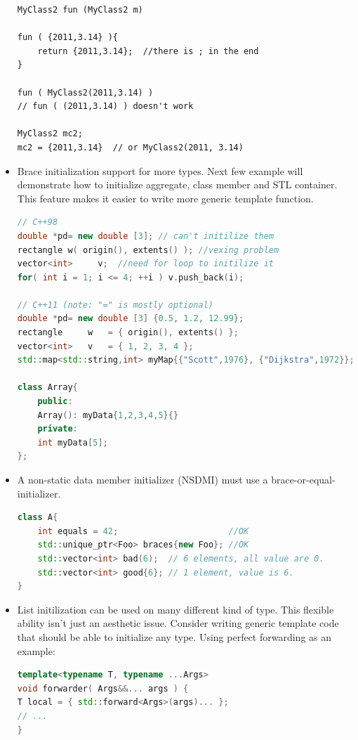 \documentclass[a4paper,11pt,twoside]{book}
\begin{document}
\begin{itemize}
\begin{lstlisting}
MyClass2 fun (MyClass2 m) 

fun ( {2011,3.14} ){
	return {2011,3.14};  //there is ; in the end
}

fun ( MyClass2(2011,3.14) ) 
// fun ( (2011,3.14) ) doesn't work

MyClass2 mc2;
mc2 = {2011,3.14}  // or MyClass2(2011, 3.14)
\end{lstlisting}

    \item Brace initialization support for more types. Next few example will demonstrate how to initialize aggregate, class member and STL container. This feature makes it easier to write more generic template function. 

\begin{lstlisting}[frame=single, language=c++,mathescape=true]
// C++98 
double *pd= new double [3]; // can't initilize them
rectangle w( origin(), extents() ); //vexing problem
vector<int>     v;  //need for loop to initilize it
for( int i = 1; i <= 4; ++i ) v.push_back(i);

// C++11 (note: "=" is mostly optional)
double *pd= new double [3] {0.5, 1.2, 12.99};
rectangle     w   = { origin(), extents() }; 
vector<int>   v   = { 1, 2, 3, 4 };
std::map<std::string,int> myMap{{"Scott",1976}, {"Dijkstra",1972}};

class Array{
	public:
	Array(): myData{1,2,3,4,5}{}    
	private:
	int myData[5];
};
\end{lstlisting}

\item A non-static data member initializer (NSDMI) must use a brace-or-equal-initializer.
\begin{lstlisting}[frame=single, language=c++, mathescape=true]
class A{
	int equals = 42;                      //OK
	std::unique_ptr<Foo> braces{new Foo}; //OK
	std::vector<int> bad(6);  // 6 elements, all value are 0.
	std::vector<int> good{6}; // 1 element, value is 6. 
}  	
\end{lstlisting}
	
\item List initilization can be used on many different kind of type. This flexible ability isn't just an aesthetic issue. Consider writing generic template code that should be able to initialize any type. Using perfect forwarding as an example:

\begin{lstlisting}[frame=single, language=c++,mathescape=true]
template<typename T, typename ...Args>
void forwarder( Args&&... args ) {
T local = { std::forward<Args>(args)... };
// ...
}


\end{lstlisting}
\end{itemize}
\end{document}
